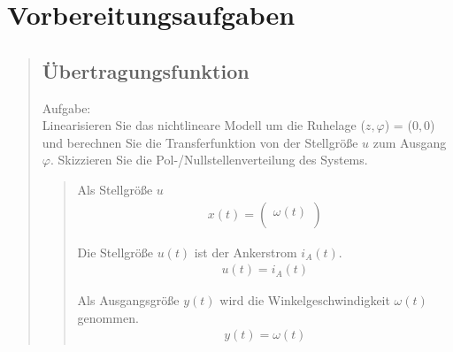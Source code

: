 \section{Vorbereitungsaufgaben}
\begin{quote}
	\hspace{-2em}
	\subsection{Übertragungsfunktion}
    Aufgabe:\\
    Linearisieren Sie das nichtlineare Modell um die Ruhelage ($z, \varphi$) = ($0, 0$) und berechnen Sie die
    Transferfunktion von der Stellgröße $u$ zum Ausgang $\varphi$. Skizzieren Sie die Pol-/Nullstellenverteilung des
    Systems.
	\begin{quote}
	   Als Stellgröße $u$
        \begin{equation*}
            \begin{split}
                x(t) = 
                    \begin {pmatrix}
                        \omega(t)\\
                    \end{pmatrix}
            \end{split}
        \end{equation*}
        
        Die Stellgröße $u(t)$ ist der Ankerstrom $i_A(t)$.
        \begin{equation*}
            \begin{split}
                u(t) = i_A (t)
            \end{split}
        \end{equation*}
        
        Als Ausgangsgröße $y(t)$ wird die Winkelgeschwindigkeit $\omega(t)$ genommen.
        \begin{equation*}
            \begin{split}
                y(t) = \omega(t)
            \end{split}
        \end{equation*}
        

\end{quote}
\end{quote}
